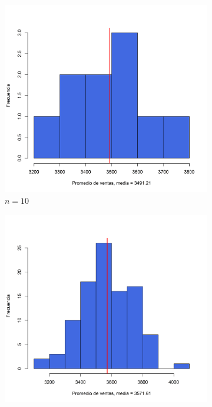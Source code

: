 \documentclass{article}
\begin{document}
\begin{figure}[h]
    \begin{center}
    \captionsetup{justification=centering}
    \begin{subfigure}[b]{0.5\textwidth}
        \includegraphics[scale=0.45]{Figures/10-100.png}
        \caption{$n=10$}
    \end{subfigure}
    \begin{subfigure}[b]{0.45\textwidth}
        \includegraphics[scale=0.45]{Figures/100-100.png}

\end{subfigure}
\end{center}
\end{figure}
\end{document}
